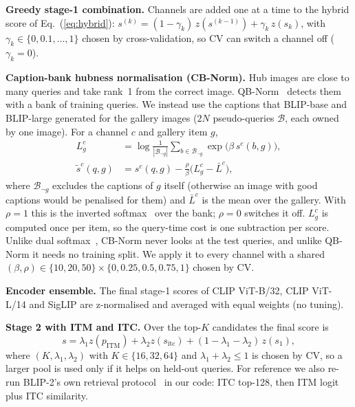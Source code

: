 \documentclass[conference]{IEEEtran}
\begin{document}
\textbf{Greedy stage-1 combination.} Channels are added one at a time to the hybrid score of
Eq.~(\ref{eq:hybrid}): $s^{(k)}=(1-\gamma_k)\,z(s^{(k-1)})+\gamma_k\, z(s_k)$, with
$\gamma_k\in\{0,0.1,\dots,1\}$ chosen by cross-validation, so CV can switch a channel off ($\gamma_k=0$).

\textbf{Caption-bank hubness normalisation (CB-Norm).} Hub images are close to many queries and take rank~1
from the correct image. QB-Norm~\cite{bogolin2022qbnorm} detects them with a bank of training queries. We
instead use the captions that BLIP-base and BLIP-large generated for the gallery images ($2N$ pseudo-queries
$\mathcal{B}$, each owned by one image). For a channel $c$ and gallery item $g$,
\begin{equation}
\begin{aligned}
L^c_g &= \log \frac{1}{|\mathcal{B}_{\neg g}|}\sum_{b\in\mathcal{B}_{\neg g}} \exp\big(\beta\, s^c(b,g)\big),\\
\tilde{s}^c(q,g) &= s^c(q,g) - \tfrac{\rho}{\beta}\big(L^c_g-\bar{L}^c\big),
\end{aligned}
\label{eq:cbnorm}
\end{equation}
where $\mathcal{B}_{\neg g}$ excludes the captions of $g$ itself (otherwise an image with good captions would
be penalised for them) and $\bar{L}^c$ is the mean over the gallery. With $\rho=1$ this is the inverted
softmax~\cite{smith2017invsoftmax} over the bank; $\rho=0$ switches it off. $L^c_g$ is computed once per item,
so the query-time cost is one subtraction per score. Unlike dual softmax~\cite{cheng2021camoe}, CB-Norm never
looks at the test queries, and unlike QB-Norm it needs no training split. We apply it to every channel with a
shared $(\beta,\rho)\in\{10,20,50\}\times\{0,0.25,0.5,0.75,1\}$ chosen by CV.

\textbf{Encoder ensemble.} The final stage-1 scores of CLIP ViT-B/32, CLIP ViT-L/14 and SigLIP are
z-normalised and averaged with equal weights (no tuning).

\textbf{Stage 2 with ITM and ITC.} Over the top-$K$ candidates the final score is
\begin{equation}
s = \lambda_1 z(p_\mathrm{ITM}) + \lambda_2 z(s_\mathrm{itc}) + (1-\lambda_1-\lambda_2)\, z(s_1),
\label{eq:rerank2}
\end{equation}
where $(K,\lambda_1,\lambda_2)$ with $K\in\{16,32,64\}$ and $\lambda_1+\lambda_2\le 1$ is chosen by CV, so a
larger pool is used only if it helps on held-out queries. For reference we also re-run BLIP-2's own retrieval
protocol~\cite{li2023blip2} in our code: ITC top-128, then ITM logit plus ITC similarity.
\end{document}

